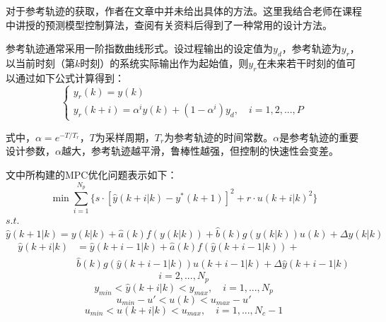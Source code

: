 \documentclass[UTF8, 12pt]{article}
\begin{document}
对于参考轨迹的获取，作者在文章中并未给出具体的方法。这里我结合老师在课程中讲授的预测模型控制算法，查阅有关资料后得到了一种常用的设计方法。

参考轨迹通常采用一阶指数曲线形式。设过程输出的设定值为$y_d$，参考轨迹为$y_r$，以当前时刻（第$k$时刻）的系统实际输出作为起始值，则$y_r$在未来若干时刻的值可以通过如下公式计算得到：
\begin{equation*}
	\begin{cases}
		y_r(k) = y(k) \\
		y_r(k + i) = \alpha^iy(k) + (1 - \alpha^i)y_d,\quad i = 1,2,...,P
	\end{cases}
\end{equation*}

式中，$\alpha = e^{-T/T_r}$，$T$为采样周期，$T_r$为参考轨迹的时间常数。$\alpha$是参考轨迹的重要设计参数，$\alpha$越大，参考轨迹越平滑，鲁棒性越强，但控制的快速性会变差。

文中所构建的MPC优化问题表示如下：
\begin{equation*}
	\min\sum_{i=1}^{N_p} \{ s\cdot[\hat{y}(k+i|k) - y^*(k+1)]^2 + r\cdot u(k+i|k)^2 \}
\end{equation*}
$s.t.$
\begin{equation*}
	\hat{y}(k+1|k) = y(k|k) + \hat{a}(k)f(y(k|k)) + \hat{b}(k)g(y(k|k))u(k) + \Delta y(k|k)
\end{equation*}
\begin{align*}
	\hat{y}(k+i|k) &= \hat{y}(k+i-1|k) + \hat{a}(k) f(\hat{y}(k+i-1|k)) + \\
	& \hat{b}(k)g(\hat{y}(k+i-1|k))u(k+i-1|k) + \Delta\hat{y}(k+i-1|k)
\end{align*}
\begin{equation*}
	i = 2,...,N_p
\end{equation*}
\begin{equation*}
	y_{min} < \hat{y}(k+i|k) < y_{max},\quad i = 1, ..., N_p
\end{equation*}
\begin{equation*}
	u_{min} - u' < u(k) < u_{max} - u'
\end{equation*}
\begin{equation*}
	u_{min} < u(k+i|k) < u_{max},\quad i = 1, ..., N_c - 1
\end{equation*}

\end{document}
